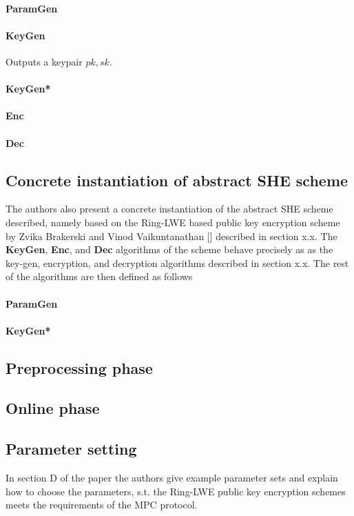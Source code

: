 \documentclass{article}
\begin{document}
\paragraph{ParamGen}
\paragraph{KeyGen}
Outputs a keypair $pk, sk$.
\paragraph{KeyGen*} 
\paragraph{Enc}
\paragraph{Dec}

\subsection{Concrete instantiation of abstract SHE scheme}
The authors also present a concrete instantiation of the abstract SHE scheme described, namely based on the Ring-LWE based public key encryption scheme by Zvika Brakerski and Vinod Vaikuntanathan [] described in section x.x. The \textbf{KeyGen}, \textbf{Enc}, and \textbf{Dec} algorithms of the scheme behave precisely as as the key-gen, encryption, and decryption algorithms described in section x.x. %
The rest of the algorithms are then defined as follows
\paragraph{ParamGen}
\paragraph{KeyGen*} 

\subsection{Preprocessing phase} \label{Prep}
\subsection{Online phase} \label{Online}
\subsection{Parameter setting}
In section D of the paper the authors give example parameter sets and explain how to choose the parameters, s.t. the Ring-LWE public key encryption schemes meets the requirements of the MPC protocol.
\end{document}
